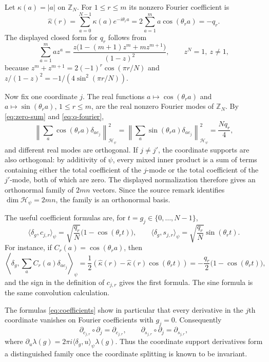\documentclass[11pt]{article}
\newcommand{\Z}{\mathbb Z}
\newcommand{\Hcal}{\mathcal H}
\begin{document}
Let $\kappa(a)=|a|$ on $\Z_N$.  For $1\le r\le m$ its nonzero Fourier
coefficient is
\begin{equation}\label{eq:q-fourier}
  \widehat\kappa(r)=\sum_{a=0}^{N-1}\kappa(a)e^{-i\theta_r a}
  =2\sum_{a=1}^m a\cos(\theta_r a)=-q_r .
\end{equation}
The displayed closed form for $q_r$ follows from
\[
  \sum_{a=1}^m az^a=\frac{z\bigl(1-(m+1)z^m+mz^{m+1}\bigr)}{(1-z)^2},
  \qquad z^N=1,\ z\ne1,
\]
because $z^m+z^{m+1}=2(-1)^r\cos(\pi r/N)$ and
$z/(1-z)^2=-1/(4\sin^2(\pi r/N))$.

Now fix one coordinate $j$.  The real functions
$a\mapsto \cos(\theta_r a)$ and $a\mapsto\sin(\theta_r a)$, $1\le r\le m$,
are the real nonzero Fourier modes of $\Z_N$.  By \eqref{eq:zero-sum} and
\eqref{eq:q-fourier},
\[
 \left\|\sum_a \cos(\theta_r a)\delta_{ae_j}\right\|_{\Hcal_\psi}^2
 =
 \left\|\sum_a \sin(\theta_r a)\delta_{ae_j}\right\|_{\Hcal_\psi}^2
 =\frac{Nq_r}{4},
\]
and different real modes are orthogonal.  If $j\ne j'$, the coordinate
supports are also orthogonal: by additivity of $\psi$, every mixed inner
product is a sum of terms containing either the total coefficient of the
$j$-mode or the total coefficient of the $j'$-mode, both of which are zero.
The displayed normalization therefore gives an orthonormal family of
$2mn$ vectors.  Since the source remark identifies
$\dim\Hcal_\psi=2mn$, the family is an orthonormal basis.

The useful coefficient formulas are, for $t=g_j\in\{0,\ldots,N-1\}$,
\begin{equation}\label{eq:coefficients}
  \langle \delta_g,c_{j,r}\rangle_\psi
  =\sqrt{\frac{q_r}{N}}\bigl(1-\cos(\theta_r t)\bigr),\qquad
  \langle \delta_g,s_{j,r}\rangle_\psi
  =\sqrt{\frac{q_r}{N}}\sin(\theta_r t).
\end{equation}
For instance, if $C_r(a)=\cos(\theta_r a)$, then
\[
  \left\langle \delta_g,\sum_a C_r(a)\delta_{ae_j}\right\rangle_\psi
  =\frac{1}{2}\left(\widehat\kappa(r)-\widehat\kappa(r)\cos(\theta_r t)\right)
  =-\frac{q_r}{2}\bigl(1-\cos(\theta_r t)\bigr),
\]
and the sign in the definition of $c_{j,r}$ gives the first formula.  The sine
formula is the same convolution calculation.

The formulas \eqref{eq:coefficients} show in particular that every derivative
in the $j$th coordinate vanishes on Fourier coefficients with $g_j=0$.
Consequently
\[
  \partial_{c_{j,r}}\circ\partial_j=\partial_{c_{j,r}},
  \qquad
  \partial_{s_{j,r}}\circ\partial_j=\partial_{s_{j,r}},
\]
where $\partial_u\lambda(g)=2\pi i\langle\delta_g,u\rangle_\psi\lambda(g)$.
Thus the coordinate support derivatives form a distinguished family once the
coordinate splitting is known to be invariant.
\end{document}
